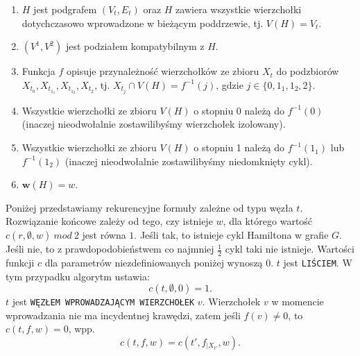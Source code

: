 \documentclass[12pt, oneside]{report}
\begin{document}
\begin{enumerate}[label=(\roman*)]
\item $H$ jest podgrafem $(V_t, E_t)$ oraz $H$ zawiera wszystkie wierzchołki dotychczasowo wprowadzone w bieżącym poddrzewie, tj. $V(H) = V_t$.
\item $(V^1, V^2)$ jest podziałem kompatybilnym z $H$.
\item Funkcja $f$ opisuje przynależność wierzchołków ze zbioru $X_t$ do podzbiorów $X_{t_0}, X_{t_{1_1}}, X_{t_{1_2}}, X_{t_2}$, tj. $X_{t_j} \cap V(H) = f^{-1}(j)$, gdzie $j \in \{0,1_1,1_2,2\}$.
\item Wszystkie wierzchołki ze zbioru $V(H)$ o stopniu 0 należą do $f^{-1}(0)$ (inaczej nieodwołalnie zostawilibyśmy wierzchołek izolowany).
\item Wszystkie wierzchołki ze zbioru $V(H)$ o stopniu 1 należą do $f^{-1}(1_1)$ lub $f^{-1}(1_2)$ (inaczej nieodwołalnie zostawilibyśmy niedomknięty cykl).
\item $\mathbf{w}(H) = w$.
\end{enumerate}

Poniżej przedstawiamy rekurencyjne formuły zależne od typu węzła $t$. Rozwiązanie końcowe zależy od tego, czy istnieje $w$, dla którego wartość $c(r,\emptyset,w) \ mod \ 2$ jest równa $1$. Jeśli tak, to istnieje cykl Hamiltona w grafie $G$. Jeśli nie, to z prawdopodobieństwem co najmniej $\frac{1}{2}$ cykl taki nie istnieje. Wartości funkcji $c$ dla parametrów niezdefiniowanych poniżej wynoszą $0$.
\newline\newline
$t$ jest \texttt{LIŚCIEM}. W tym przypadku algorytm ustawia:
$$c(t,\emptyset,0) = 1.$$
\newline
$t$ jest \texttt{WĘZŁEM WPROWADZAJĄCYM WIERZCHOŁEK} $v$. Wierzchołek $v$ w momencie wprowadzania nie ma incydentnej krawędzi, zatem jeśli $f(v) \neq 0$, to $c(t,f,w) = 0$, wpp.
$$c(t,f,w) = c(t',f_{\big|X_{t'}},w).$$
\end{document}
